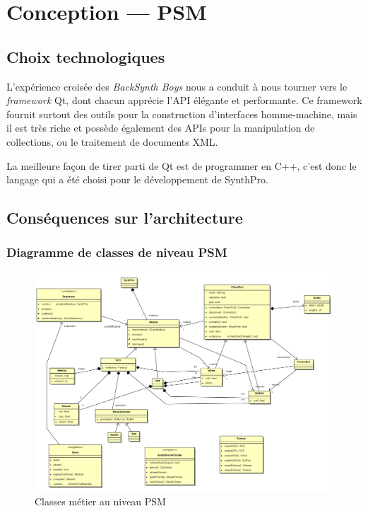 \section{Conception — PSM}

\subsection{Choix technologiques}

L'expérience croisée des \emph{BackSynth Boys} nous a conduit à
nous tourner vers le \emph{framework} Qt, dont chacun apprécie
l'API élégante et performante. Ce framework fournit surtout des
outils pour la construction d'interfaces homme-machine, mais il est
très riche et possède également des APIs pour la manipulation de
collections, ou le traitement de documents XML.

La meilleure façon de tirer parti de Qt est de programmer en C++,
c'est donc le langage qui a été choisi pour le développement de
SynthPro.

\subsection{Conséquences sur l'architecture}

\subsubsection{Diagramme de classes de niveau PSM}

\begin{figure}[htb]
\centering
\includegraphics[width=17cm]{../img/ps/business-psm.pdf}
\caption{Classes métier au niveau PSM}
\label{psm-class}
\end{figure}

